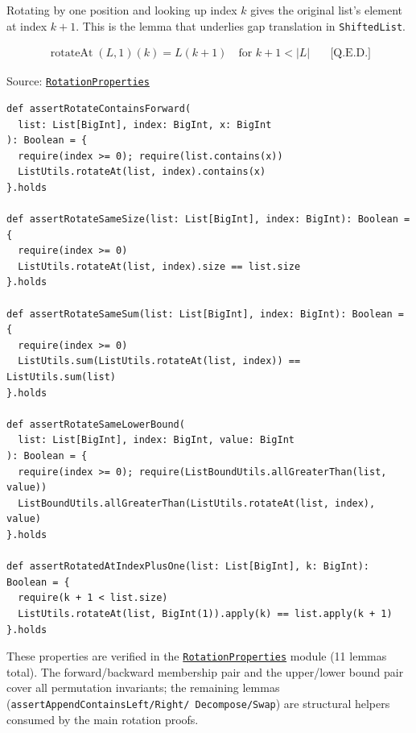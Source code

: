 Rotating by one position and looking up index $k$ gives the original
list's element at index $k + 1$. This is the lemma that underlies gap
translation in \texttt{ShiftedList}.

\begin{equation*}
\begin{aligned}
\operatorname{rotateAt}(L, 1)(k) = L(k + 1) \quad \text{for } k + 1 < |L| \quad &
\text{[Q.E.D.]}
\end{aligned}
\end{equation*}

Source:
\href{https://github.com/thiagomata/prime-numbers/blob/list-article-v1.0.0/src/main/scala/v1/chapter3/list/properties/RotationProperties.scala}{\texttt{RotationProperties}}

\begin{lstlisting}[style=scala]
def assertRotateContainsForward(
  list: List[BigInt], index: BigInt, x: BigInt
): Boolean = {
  require(index >= 0); require(list.contains(x))
  ListUtils.rotateAt(list, index).contains(x)
}.holds

def assertRotateSameSize(list: List[BigInt], index: BigInt): Boolean = {
  require(index >= 0)
  ListUtils.rotateAt(list, index).size == list.size
}.holds

def assertRotateSameSum(list: List[BigInt], index: BigInt): Boolean = {
  require(index >= 0)
  ListUtils.sum(ListUtils.rotateAt(list, index)) == ListUtils.sum(list)
}.holds

def assertRotateSameLowerBound(
  list: List[BigInt], index: BigInt, value: BigInt
): Boolean = {
  require(index >= 0); require(ListBoundUtils.allGreaterThan(list, value))
  ListBoundUtils.allGreaterThan(ListUtils.rotateAt(list, index), value)
}.holds

def assertRotatedAtIndexPlusOne(list: List[BigInt], k: BigInt): Boolean = {
  require(k + 1 < list.size)
  ListUtils.rotateAt(list, BigInt(1)).apply(k) == list.apply(k + 1)
}.holds
\end{lstlisting}

{\raggedright
These properties are verified in the
\href{https://github.com/thiagomata/prime-numbers/blob/list-article-v1.0.0/src/main/scala/v1/chapter3/list/properties/RotationProperties.scala}{\texttt{RotationProperties}}
module (11 lemmas total). The forward/backward membership pair and the
upper/lower bound pair cover all permutation invariants; the remaining
lemmas (\texttt{assertAppendContainsLeft/\allowbreak Right/\allowbreak
Decompose/\allowbreak Swap}) are structural helpers consumed by the main
rotation proofs.
\par}
